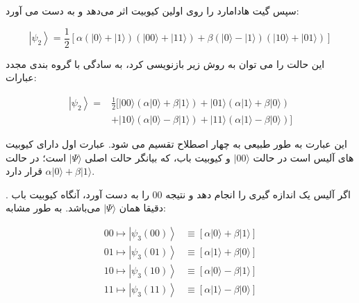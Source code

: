 \documentclass{book}
\begin{document}
سپس گیت هادامارد را روی اولین کیوبیت اثر می‌دهد و به دست می آورد:

\begin{center}
	\begin{equation}\label{Teleport psi2}
		\left|\psi_2\right\rangle=\frac{1}{2}[\alpha(|0\rangle+|1\rangle)(|00\rangle+|11\rangle)+\beta(|0\rangle-|1\rangle)(|10\rangle+|01\rangle)]
	\end{equation}
\end{center}

این حالت را می توان به روش زیر بازنویسی کرد، به سادگی با گروه بندی مجدد عبارات:

\begin{center}
	\begin{equation}\label{Teleport psi2 rewrite}
		\begin{aligned}
			\left|\psi_2\right\rangle= & \frac{1}{2}[|00\rangle(\alpha|0\rangle+\beta|1\rangle)+|01\rangle(\alpha|1\rangle+\beta|0\rangle) \\
			& +|10\rangle(\alpha|0\rangle-\beta|1\rangle)+|11\rangle(\alpha|1\rangle-\beta|0\rangle)]
		\end{aligned}
	\end{equation}

\end{center}


این عبارت به طور طبیعی به چهار اصطلاح تقسیم می شود. عبارت اول دارای کیوبیت های آلیس است
در حالت $\vert 00 \rangle$ و کیوبیت باب، که بیانگر حالت اصلی $\vert \Psi \rangle$ است؛ در حالت $\alpha \vert 0 \rangle + \beta \vert 1 \rangle$  قرار دارد.


. اگر آلیس یک اندازه گیری را انجام دهد و نتیجه 00 را به دست آورد، آنگاه کیوبیت باب دقیقا همان $\vert \Psi \rangle$ می‌باشد. به طور مشابه:
\begin{center}
	\begin{equation}\label{alice action}
		\begin{aligned}
			00 \longmapsto\left|\psi_3(00)\right\rangle & \equiv[\alpha|0\rangle+\beta|1\rangle] \\
			01 \longmapsto\left|\psi_3(01)\right\rangle & \equiv[\alpha|1\rangle+\beta|0\rangle] \\
			10 \longmapsto\left|\psi_3(10)\right\rangle & \equiv[\alpha|0\rangle-\beta|1\rangle] \\
			11 \longmapsto\left|\psi_3(11)\right\rangle & \equiv[\alpha|1\rangle-\beta|0\rangle]
		\end{aligned}
	\end{equation}
\end{center}
\end{document}
